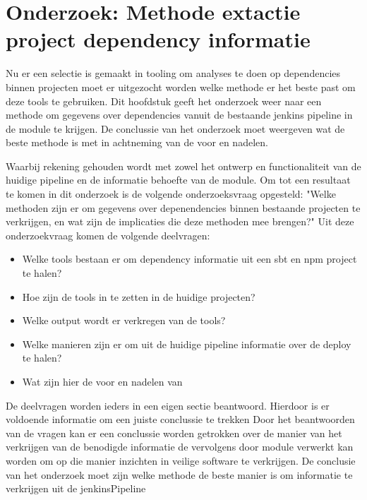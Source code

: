 
\chapter{Onderzoek: Methode extactie project dependency informatie}\label{ch:onderzoek:-methode-extactie-project-dependency-informatie}

Nu er een selectie is gemaakt in tooling om analyses te doen op dependencies binnen projecten moet er uitgezocht worden welke methode er het beste past om deze tools te gebruiken.
Dit hoofdstuk geeft het onderzoek weer naar een methode om gegevens over dependencies vanuit de bestaande jenkins pipeline in de module te krijgen. De conclussie van het onderzoek moet weergeven wat de beste methode is met in achtneming van de voor en nadelen.


Waarbij rekening gehouden wordt met zowel het ontwerp en functionaliteit van de huidige pipeline en de informatie behoefte van de module. Om tot een resultaat te komen in dit onderzoek is de volgende onderzoeksvraag opgesteld: "Welke methoden zijn er om gegevens over depenendencies binnen bestaande projecten te verkrijgen, en wat zijn de implicaties die deze methoden mee brengen?" Uit deze onderzoekvraag komen de volgende deelvragen:
\begin{itemize}
    \item Welke tools bestaan er om dependency informatie uit een sbt en npm project te halen?
    \item Hoe zijn de tools in te zetten in de huidige projecten?
    \item Welke output wordt er verkregen van de tools?
    \item Welke manieren zijn er om uit de huidige pipeline informatie over de deploy te halen?
    \item Wat zijn hier de voor en nadelen van
\end{itemize}
De deelvragen worden ieders in een eigen sectie beantwoord. Hierdoor is er voldoende informatie om een juiste conclussie te trekken
Door het beantwoorden van de vragen kan er een conclussie worden getrokken over de manier van het verkrijgen van de benodigde informatie de vervolgens door module verwerkt kan worden om op die manier inzichten in veilige software te verkrijgen.
De conclusie van het onderzoek moet zijn welke methode de beste manier is om informatie te verkrijgen uit de jenkinsPipeline


